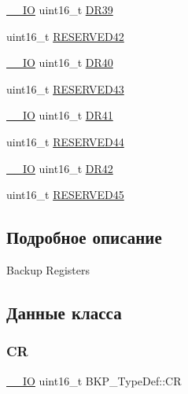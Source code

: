 \begin{DoxyCompactItemize}
\mbox{\hyperlink{group___c_m_s_i_s___c_m3__core__definitions_gaec43007d9998a0a0e01faede4133d6be}{\+\_\+\+\_\+\+IO}} uint16\+\_\+t \mbox{\hyperlink{struct_b_k_p___type_def_a599452e0f9d6e1e1fa75730aec9228fd}{D\+R39}}
\item 
uint16\+\_\+t \mbox{\hyperlink{struct_b_k_p___type_def_a6c6fdbc4e9c4da805e346636cc2ef0c2}{R\+E\+S\+E\+R\+V\+E\+D42}}
\item 
\mbox{\hyperlink{group___c_m_s_i_s___c_m3__core__definitions_gaec43007d9998a0a0e01faede4133d6be}{\+\_\+\+\_\+\+IO}} uint16\+\_\+t \mbox{\hyperlink{struct_b_k_p___type_def_a1811cf03bde48bc9becc8795d3e09d7f}{D\+R40}}
\item 
uint16\+\_\+t \mbox{\hyperlink{struct_b_k_p___type_def_ab83c42a1464c23dc1ed953a7eb5dc42a}{R\+E\+S\+E\+R\+V\+E\+D43}}
\item 
\mbox{\hyperlink{group___c_m_s_i_s___c_m3__core__definitions_gaec43007d9998a0a0e01faede4133d6be}{\+\_\+\+\_\+\+IO}} uint16\+\_\+t \mbox{\hyperlink{struct_b_k_p___type_def_a9e9b72b388e2ed718df333cfb9e90226}{D\+R41}}
\item 
uint16\+\_\+t \mbox{\hyperlink{struct_b_k_p___type_def_ace6f58bc4fe4083665e1512dfc6018c2}{R\+E\+S\+E\+R\+V\+E\+D44}}
\item 
\mbox{\hyperlink{group___c_m_s_i_s___c_m3__core__definitions_gaec43007d9998a0a0e01faede4133d6be}{\+\_\+\+\_\+\+IO}} uint16\+\_\+t \mbox{\hyperlink{struct_b_k_p___type_def_af7a01e3a3e1be76ebb8100e7ff6de9c0}{D\+R42}}
\item 
uint16\+\_\+t \mbox{\hyperlink{struct_b_k_p___type_def_affa0a45a3aaa83ef2949761b44ad4283}{R\+E\+S\+E\+R\+V\+E\+D45}}
\end{DoxyCompactItemize}


\subsection{Подробное описание}
Backup Registers ~\newline
 

\subsection{Данные класса}
\mbox{\label{struct_b_k_p___type_def_adbf9c928b534b4a017429de248982284}} 
\subsubsection{\texorpdfstring{CR}{CR}}
{\footnotesize\ttfamily \mbox{\hyperlink{group___c_m_s_i_s___c_m3__core__definitions_gaec43007d9998a0a0e01faede4133d6be}{\+\_\+\+\_\+\+IO}} uint16\+\_\+t B\+K\+P\+\_\+\+Type\+Def\+::\+CR}

